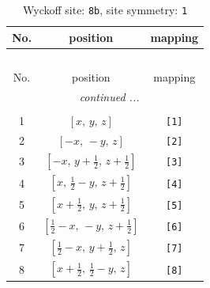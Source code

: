 \documentclass[fleqn,8pt]{jsarticle}
\begin{document}
\begin{longtable}{ccc}
\caption{Wyckoff site: {\tt 8b}, site symmetry: {\tt 1}}
 \\
 \hline \hline
No. & position & mapping \\ \hline \endfirsthead

\multicolumn{2}{l}{\tablename\ \thetable{}} \\
 \hline \hline
No. & position & mapping \\ \hline \endhead

 \hline \hline
\multicolumn{2}{r}{\footnotesize\it continued ...} \\ \endfoot

 \hline \hline
\multicolumn{2}{r}{} \\ \endlastfoot

1 & $\left[ x,\, y,\, z \right]$ & {\tt [1]} \\ \hline
2 & $\left[ - x,\, - y,\, z \right]$ & {\tt [2]} \\ \hline
3 & $\left[ - x,\, y + \frac{1}{2},\, z + \frac{1}{2} \right]$ & {\tt [3]} \\ \hline
4 & $\left[ x,\, \frac{1}{2} - y,\, z + \frac{1}{2} \right]$ & {\tt [4]} \\ \hline
5 & $\left[ x + \frac{1}{2},\, y,\, z + \frac{1}{2} \right]$ & {\tt [5]} \\ \hline
6 & $\left[ \frac{1}{2} - x,\, - y,\, z + \frac{1}{2} \right]$ & {\tt [6]} \\ \hline
7 & $\left[ \frac{1}{2} - x,\, y + \frac{1}{2},\, z \right]$ & {\tt [7]} \\ \hline
8 & $\left[ x + \frac{1}{2},\, \frac{1}{2} - y,\, z \right]$ & {\tt [8]} \\
\end{longtable}
\end{document}
